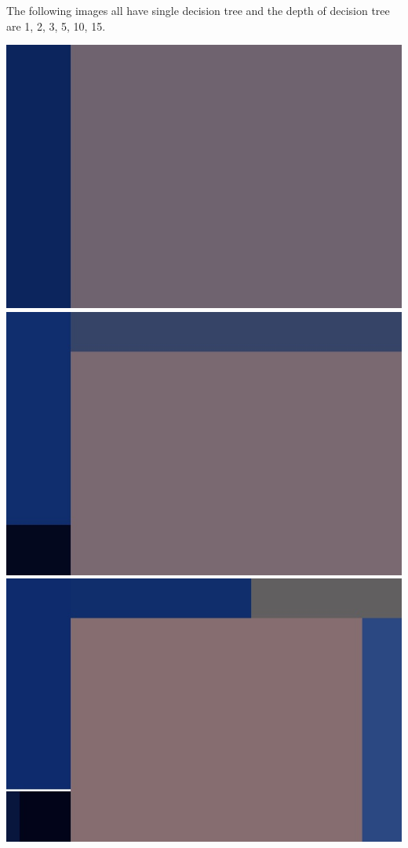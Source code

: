 \documentclass[12pt]{article}
\begin{document}
{\medskip
The following images all have single decision tree and the depth of decision tree are 1, 2, 3, 5, 10, 15.

\includegraphics[scale=0.12]{P1/RF_Trump_depth1trees1.jpg}
\includegraphics[scale=0.12]{P1/RF_Trump_depth2trees1.jpg}
\includegraphics[scale=0.12]{P1/RF_Trump_depth3trees1.jpg}
}
\end{document}
